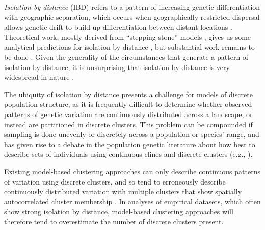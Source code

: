 \documentclass[10pt,letterpaper]{article}
\begin{document}
\emph{Isolation by distance} (IBD) refers to a pattern of increasing genetic differentiation
with geographic separation,
which occurs when geographically restricted dispersal allows
genetic drift to build up differentiation between distant locations
\cite{Wright1943}. 
Theoretical work,
mostly derived from ``stepping-stone'' models 
\cite{kimura1964stepping,sawyer1976stepping,shiga1984stepping},
gives us some analytical predictions for isolation by distance
\cite{malecot1969mathematics,Slatkin1985,epperson2003geographical}, 
but substantial work remains to be done \cite{barton2002neutral,barton2013modelling}.
Given the generality of the circumstances that generate a pattern of isolation by distance, 
it is unsurprising that isolation by distance is very widespread in nature \cite{meirmans2012,Sexton_etal_2014}.

The ubiquity of isolation by distance presents a challenge for models of discrete population structure,
as it is frequently difficult to determine whether observed patterns of genetic variation are 
continuously distributed across a landscape, or instead are partitioned in discrete clusters.
This problem can be compounded if sampling is done unevenly or discretely across a population or species' range,
and has given rise to a debate in the population genetic literature
about how best to describe sets of individuals using continuous clines and discrete clusters 
(e.g., \cite{SerrePaabo2004,rosenberg2005clines}).

Existing model-based clustering approaches can only describe continuous patterns of variation using
discrete clusters, and so tend to erroneously describe continuously distributed variation with multiple clusters that 
show spatially autocorrelated cluster membership \cite{Frantz2009,meirmans2012}.
In analyses of empirical datasets, which often show strong isolation by distance,
model-based clustering approaches will therefore tend to overestimate
the number of discrete clusters present. 
\end{document}
